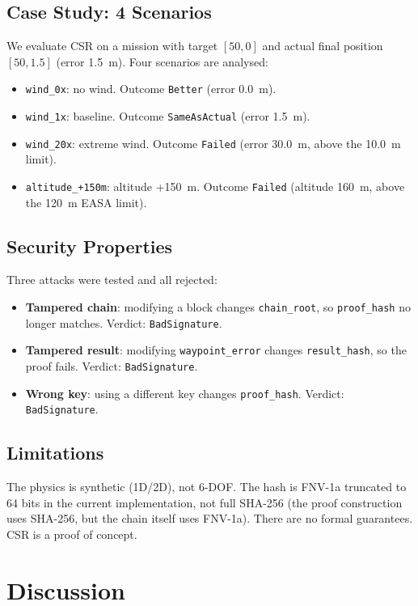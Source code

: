 \subsection{Case Study: 4 Scenarios}
We evaluate CSR on a mission with target $[50, 0]$ and actual final
position $[50, 1.5]$ (error 1.5~m). Four scenarios are analysed:
\begin{itemize}
    \item \texttt{wind\_0x}: no wind. Outcome \texttt{Better}
          (error 0.0~m).
    \item \texttt{wind\_1x}: baseline. Outcome \texttt{SameAsActual}
          (error 1.5~m).
    \item \texttt{wind\_20x}: extreme wind. Outcome \texttt{Failed}
          (error 30.0~m, above the 10.0~m limit).
    \item \texttt{altitude\_+150m}: altitude +150~m. Outcome
          \texttt{Failed} (altitude 160~m, above the 120~m EASA
          limit).
\end{itemize}

\subsection{Security Properties}
Three attacks were tested and all rejected:
\begin{itemize}
    \item \textbf{Tampered chain}: modifying a block changes
          \texttt{chain\_root}, so \texttt{proof\_hash} no longer
          matches. Verdict: \texttt{BadSignature}.
    \item \textbf{Tampered result}: modifying \texttt{waypoint\_error}
          changes \texttt{result\_hash}, so the proof fails.
          Verdict: \texttt{BadSignature}.
    \item \textbf{Wrong key}: using a different key changes
          \texttt{proof\_hash}. Verdict: \texttt{BadSignature}.
\end{itemize}

\subsection{Limitations}
The physics is synthetic (1D/2D), not 6-DOF. The hash is FNV-1a
truncated to 64 bits in the current implementation, not full
SHA-256 (the proof construction uses SHA-256, but the chain itself
uses FNV-1a). There are no formal guarantees. CSR is a proof of
concept.

\section{Discussion}

